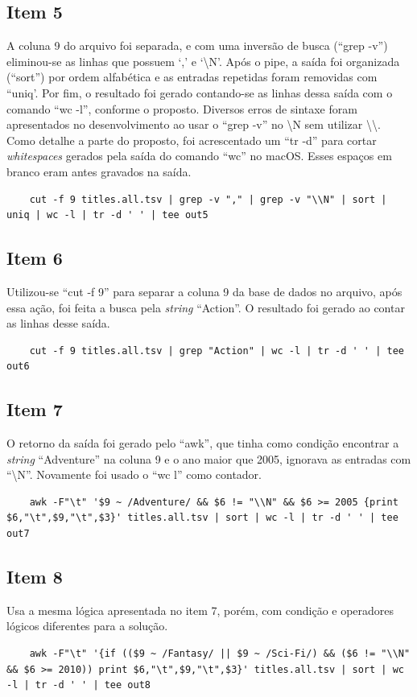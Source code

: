 \documentclass[12pt]{article}
\begin{document}
	\subsection*{Item 5}
	A coluna 9 do arquivo foi separada, e com uma inversão de busca (``grep -v'') eliminou-se as linhas que possuem `,' e `\textbackslash	N'. Após o pipe, a saída foi organizada (``sort'') por ordem alfabética e as entradas repetidas foram removidas com ``uniq'. Por fim, o resultado foi gerado contando-se as linhas dessa saída com o comando ``wc -l'', conforme o proposto.
	Diversos erros de  sintaxe foram apresentados no desenvolvimento ao usar o ``grep -v'' no \textbackslash N sem utilizar \textbackslash\textbackslash .
	Como detalhe a parte do proposto, foi acrescentado um ``tr -d'' para cortar \textit{whitespaces} gerados pela saída do comando ``wc'' no macOS. Esses espaços em branco eram antes gravados na saída. 
	\begin{verbatim}
	cut -f 9 titles.all.tsv | grep -v "," | grep -v "\\N" | sort | uniq | wc -l | tr -d ' ' | tee out5 
	\end{verbatim}
	\subsection*{Item 6}
	Utilizou-se ``cut -f 9'' para separar a coluna 9 da base de dados no arquivo, após essa ação, foi feita a busca pela \textit{string}  ``Action''. O resultado foi gerado ao contar as linhas desse saída.
	\begin{verbatim}
	cut -f 9 titles.all.tsv | grep "Action" | wc -l | tr -d ' ' | tee out6
	\end{verbatim}
	\subsection*{Item 7}
	O retorno da saída foi gerado pelo ``awk'', que tinha como condição encontrar a \textit{string} ``Adventure'' na coluna 9 e o ano maior que 2005, ignorava as entradas com ``\textbackslash N''. Novamente foi usado o ``wc l'' como contador.
	\begin{verbatim}
	awk -F"\t" '$9 ~ /Adventure/ && $6 != "\\N" && $6 >= 2005 {print $6,"\t",$9,"\t",$3}' titles.all.tsv | sort | wc -l | tr -d ' ' | tee out7
	\end{verbatim}
	\subsection*{Item 8}
	Usa a mesma lógica apresentada no item 7, porém, com condição e operadores lógicos diferentes para a solução.
	\begin{verbatim}
	awk -F"\t" '{if (($9 ~ /Fantasy/ || $9 ~ /Sci-Fi/) && ($6 != "\\N" && $6 >= 2010)) print $6,"\t",$9,"\t",$3}' titles.all.tsv | sort | wc -l | tr -d ' ' | tee out8
	\end{verbatim}
\end{document}
